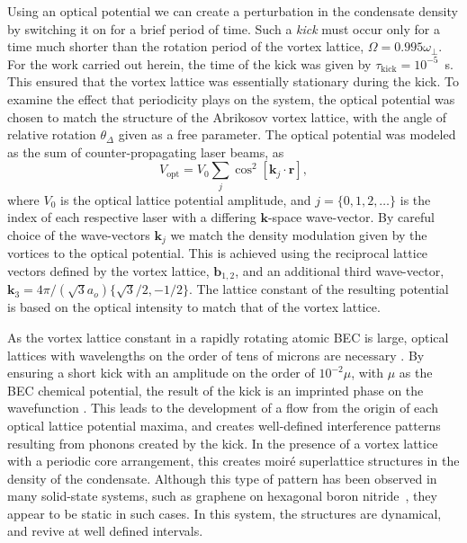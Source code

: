 Using an optical potential we can create a perturbation in the condensate density by switching it on for a brief period of time. Such a {\it kick} must occur only for a time much shorter than the rotation period of the vortex lattice, $\Omega = 0.995\omega_\perp$. For the work carried out herein, the time of the kick was given by $\tau_{\text{kick}}=10^{-5}$~s. This ensured that the vortex lattice was essentially stationary during the kick. To examine the effect that periodicity plays on the system, the optical potential was chosen to match the structure of the Abrikosov vortex lattice, with the angle of relative rotation $\theta_\Delta$ given as a free parameter. The optical potential was modeled as the sum of counter-propagating laser beams, as
\begin{equation}
    V_{\text{opt}} = V_0\displaystyle\sum_{j}\cos^2 \left[ \textbf{k}_{j}\cdot\textbf{r} \right],
\end{equation}
where $V_0$ is the optical lattice potential amplitude, and $j=\lbrace 0,1,2,\ldots \rbrace$ is the index of each respective laser with a differing $\mathbf{k}$-space wave-vector. By careful choice of the wave-vectors $\textbf{k}_{j}$ we match the density modulation given by the vortices to the optical potential. This is achieved using the reciprocal lattice vectors defined by the vortex lattice, $\mathbf{b}_{1,2}$, and an additional third wave-vector, $\mathbf{k}_3 = 4\pi/(\sqrt{3}a_o)\{\sqrt{3}/2,-1/2\}$. The lattice constant of the resulting potential is based on the optical intensity to match that of the vortex lattice.


As the vortex lattice constant in a rapidly rotating atomic BEC is large, optical lattices with wavelengths on the order of tens of microns are necessary \cite{BEC:Fallani_optexp_2005, AO:Williams_optexp_2008}. By ensuring a short kick with an amplitude on the order of $10^{-2} \mu $, with $\mu$ as the BEC chemical potential, the result of the kick is an imprinted phase on the wavefunction \cite{Vtx:Dobrek_pra_1999}. This leads to the development of a flow from the origin of each optical lattice potential maxima, and creates well-defined interference patterns resulting from phonons created by the kick. In the presence of a vortex lattice with a periodic core arrangement, this creates moir\'e superlattice structures \cite{SS:Murata_acsn_2010} in the density of the condensate. Although this type of pattern has been observed in many solid-state systems, such as graphene on hexagonal boron nitride~\cite{SS:Yankowitz_natphys_2012}, they appear to be static in such cases. In this system, the structures are dynamical, and revive at well defined intervals.

